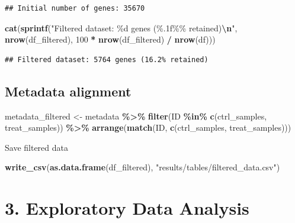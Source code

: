\documentclass[
]{article}
\newenvironment{Shaded}{\begin{snugshade}}{\end{snugshade}}
\newcommand{\DecValTok}[1]{\textcolor[rgb]{0.00,0.00,0.81}{#1}}
\newcommand{\FunctionTok}[1]{\textcolor[rgb]{0.13,0.29,0.53}{\textbf{#1}}}
\newcommand{\NormalTok}[1]{#1}
\newcommand{\OtherTok}[1]{\textcolor[rgb]{0.56,0.35,0.01}{#1}}
\newcommand{\SpecialCharTok}[1]{\textcolor[rgb]{0.81,0.36,0.00}{\textbf{#1}}}
\newcommand{\StringTok}[1]{\textcolor[rgb]{0.31,0.60,0.02}{#1}}
\begin{document}
\begin{verbatim}
## Initial number of genes: 35670
\end{verbatim}

\begin{Shaded}
\begin{Highlighting}[]
\FunctionTok{cat}\NormalTok{(}\FunctionTok{sprintf}\NormalTok{(}\StringTok{"Filtered dataset: \%d genes (\%.1f\%\% retained)}\SpecialCharTok{\textbackslash{}n}\StringTok{"}\NormalTok{, }
            \FunctionTok{nrow}\NormalTok{(df\_filtered), }
            \DecValTok{100} \SpecialCharTok{*} \FunctionTok{nrow}\NormalTok{(df\_filtered) }\SpecialCharTok{/} \FunctionTok{nrow}\NormalTok{(df)))}
\end{Highlighting}
\end{Shaded}

\begin{verbatim}
## Filtered dataset: 5764 genes (16.2% retained)
\end{verbatim}

\subsection{Metadata alignment}\label{metadata-alignment}

\begin{Shaded}
\begin{Highlighting}[]
\NormalTok{metadata\_filtered }\OtherTok{\textless{}{-}}\NormalTok{ metadata }\SpecialCharTok{\%\textgreater{}\%}
  \FunctionTok{filter}\NormalTok{(ID }\SpecialCharTok{\%in\%} \FunctionTok{c}\NormalTok{(ctrl\_samples, treat\_samples)) }\SpecialCharTok{\%\textgreater{}\%}
  \FunctionTok{arrange}\NormalTok{(}\FunctionTok{match}\NormalTok{(ID, }\FunctionTok{c}\NormalTok{(ctrl\_samples, treat\_samples)))}
\end{Highlighting}
\end{Shaded}

Save filtered data

\begin{Shaded}
\begin{Highlighting}[]
\FunctionTok{write\_csv}\NormalTok{(}\FunctionTok{as.data.frame}\NormalTok{(df\_filtered), }\StringTok{"results/tables/filtered\_data.csv"}\NormalTok{)}
\end{Highlighting}
\end{Shaded}

\section{3. Exploratory Data Analysis}\label{exploratory-data-analysis}
\end{document}
